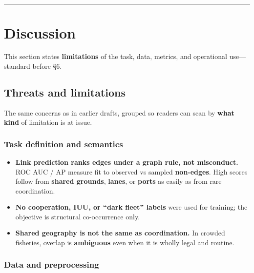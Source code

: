 \documentclass[
]{article}
\providecommand{\tightlist}{%
  \setlength{\itemsep}{0pt}\setlength{\parskip}{0pt}}
\begin{document}
\begin{center}\rule{0.5\linewidth}{0.5pt}\end{center}

\section{Discussion}\label{discussion}

This section states \textbf{limitations} of the task, data, metrics, and
operational use---standard before §6.

\subsection{Threats and limitations}\label{threats-and-limitations}

The same concerns as in earlier drafts, grouped so readers can scan by
\textbf{what kind} of limitation is at issue.

\subsubsection{Task definition and
semantics}\label{task-definition-and-semantics}

\begin{itemize}
\tightlist
\item
  \textbf{Link prediction ranks edges under a graph rule, not
  misconduct.} ROC AUC / AP measure fit to observed vs sampled
  \textbf{non-edges}. High scores follow from \textbf{shared grounds},
  \textbf{lanes}, or \textbf{ports} as easily as from rare
  coordination.\\
\item
  \textbf{No cooperation, IUU, or ``dark fleet'' labels} were used for
  training; the objective is structural co-occurrence only.\\
\item
  \textbf{Shared geography is not the same as coordination.} In crowded
  fisheries, overlap is \textbf{ambiguous} even when it is wholly legal
  and routine.
\end{itemize}

\subsubsection{Data and preprocessing}\label{data-and-preprocessing}
\end{document}
